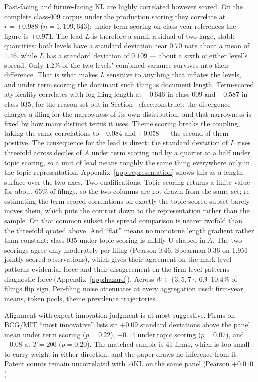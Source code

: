 \documentclass[11pt]{article}
\newcommand{\dkl}{$\Delta$KL}
\begin{document}
Past-facing and future-facing KL are highly correlated however scored. On the
complete class-009 corpus under the production scoring they correlate at
$r = +0.988$ ($n = 1{,}109{,}643$); under term scoring on class-year
references the figure is $+0.971$. The lead $L$ is therefore a small residual
of two large, stable quantities: both levels have a standard deviation near
$0.70$ nats about a mean of $1.46$, while $L$ has a standard deviation of
$0.109$ --- about a sixth of either level's spread. Only $1.2\%$ of the two
levels' combined variance survives into their difference. That is what makes $L$ sensitive to
anything that inflates the levels, and under term scoring the dominant
such thing is document length. Term-scored
atypicality correlates with log filing length at $-0.646$ in class 009 and
$-0.587$ in class 035, for the reason set out in Section~
ef{sec:construct}:
the divergence charges a filing for the narrowness of its own distribution, and
that narrowness is fixed by how many distinct terms it uses. Theme scoring
breaks the coupling, taking the same correlations to $-0.084$ and $+0.058$ ---
the second of them positive. The consequence for the lead is direct: the standard deviation
of $L$ rises threefold across deciles of $A$ under term scoring and by a
quarter to a half under topic scoring, so a unit of lead means roughly the
same thing everywhere only in the topic representation.
Appendix~\ref{app:representation} shows this as a length surface over the
two axes. Two qualifications. Topic scoring returns a finite value for about 65\% of
filings, so the two columns are not drawn from the same set; re-estimating the
term-scored correlations on exactly the topic-scored subset barely moves them,
which puts the contrast down to the representation rather than the sample. On
that common subset the spread comparison is nearer twofold than the threefold
quoted above. And ``flat'' means no
monotone length gradient rather than constant: class 035 under topic
scoring is mildly U-shaped in $A$. The two scorings agree only
moderately per filing (Pearson 0.46, Spearman 0.36 on 1.9M jointly
scored observations), which gives their agreement on the mark-level
patterns evidential force and their disagreement on the firm-level
patterns diagnostic force (Appendix~\ref{app:hazard}). Across
$W \in \{3, 5, 7\}$, 6.9--10.4\% of filings flip sign. Per-filing noise
attenuates at every aggregation used: firm-year means, token pools,
theme prevalence trajectories.

Alignment with expert innovation judgment is at most suggestive. Firms on
BCG/MIT ``most innovative'' lists sit $+0.09$ standard deviations above the panel mean
under term scoring ($p = 0.22$), $+0.14$ under topic scoring
($p = 0.07$), and $+0.08$ at $T = 200$ ($p = 0.20$). The matched
sample is 41 firms, which is too small to carry weight in either
direction, and the paper draws no inference from it. Patent counts remain
uncorrelated with \dkl{} on the same panel (Pearson $+0.010$).
\end{document}
